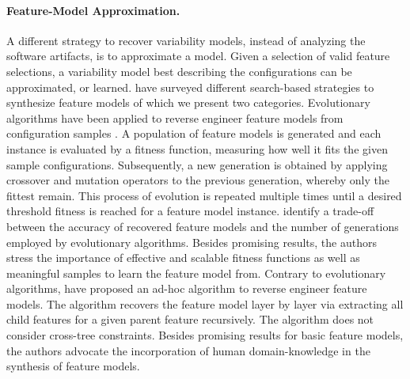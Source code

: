 \paragraph{Feature-Model Approximation.}
A different strategy to recover variability models, instead of analyzing the
software artifacts, is to approximate a model. Given a selection of valid
feature selections, a variability model best describing the configurations can
be approximated, or learned. \cite{lopez-herrejon_assessment_2015} have surveyed
different search-based strategies to synthesize feature models of which we
present two categories. Evolutionary algorithms have been applied to reverse
engineer feature models from configuration samples
\citep{lopez-herrejon_reverse_2012,linsbauer_feature_2014}. A population of
feature models is generated and each instance is evaluated by a fitness function, measuring how well it fits the given sample configurations. Subsequently, a new generation is obtained by applying
crossover and mutation operators to the previous generation, whereby only the
fittest remain. This process of evolution is repeated multiple times until a
desired threshold fitness is reached for a feature model instance.
\cite{lopez-herrejon_reverse_2012} identify a trade-off between the accuracy of
recovered feature models and the number of generations employed by evolutionary
algorithms. Besides promising results, the authors stress the importance of
effective and scalable fitness functions as well as meaningful samples to learn
the feature model from.
Contrary to evolutionary algorithms,
\cite{haslinger_reverse_2011,haslinger_extracting_2013} have proposed an ad-hoc
algorithm to reverse engineer feature models. The algorithm recovers
the feature model layer by layer via extracting all child
features for a given parent feature recursively. The algorithm does not consider
cross-tree constraints.
Besides promising results for basic feature models, the authors advocate the
incorporation of human domain-knowledge in the synthesis of feature models.
 
